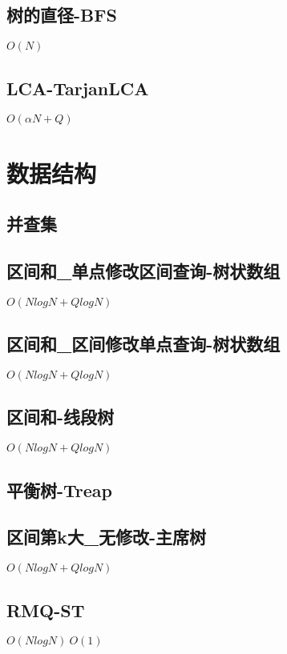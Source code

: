 \documentclass[10pt]{article}
\begin{document}
\subsection{树的直径-BFS}
$O(N)$


\subsection{LCA-TarjanLCA}
$O(αN+Q)$

\section{数据结构}
\subsection{并查集}


\subsection{区间和\_单点修改区间查询-树状数组}
$O(NlogN+QlogN)$


\subsection{区间和\_区间修改单点查询-树状数组}
$O(NlogN+QlogN)$


\subsection{区间和-线段树}
$O(NlogN+QlogN)$


\subsection{平衡树-Treap}


\subsection{区间第k大\_无修改-主席树}
$O(NlogN+QlogN)$


\subsection{RMQ-ST}
$O(NlogN)~O(1)$

\end{document}
